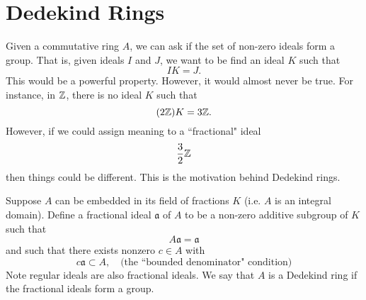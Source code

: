 \section{Dedekind Rings}
Given a commutative ring $A$, we can ask if the set of non-zero ideals form a group. That is, given ideals $I$ and $J$, we want to be find an ideal $K$ such that
\[
    IK = J.
\]
This would be a powerful property. However, it would almost never be true. For instance, in ${\mathbb Z}$, there is no ideal $K$ such that
\[
    (2{\mathbb Z})K = 3{\mathbb Z}.
\]
However, if we could assign meaning to a ``fractional" ideal
\[
    \frac{3}{2}{\mathbb Z}
\]
then things could be different. This is the motivation behind Dedekind rings.

Suppose $A$ can be embedded in its field of fractions $K$ (i.e. $A$ is an integral domain). Define a fractional ideal $\mathfrak a$ of $A$ to be a non-zero additive subgroup of $K$ such that
\[
    A\mathfrak a = \mathfrak a
\]
and such that there exists nonzero $c \in A$ with
\[
    c\mathfrak a \subset A, \quad \text{(the ``bounded denominator" condition)}
\]
Note regular ideals are also fractional ideals. We say that $A$ is a Dedekind ring if the fractional ideals form a group.
